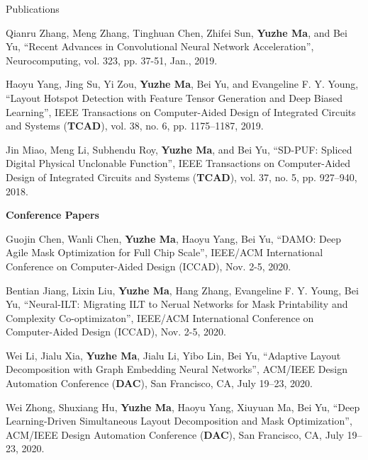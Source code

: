 \begin{rSection}{Publications}
\begin{description}[font=\normalfont]
\item[{[J3]}]{
	Qianru Zhang, Meng Zhang, Tinghuan Chen, Zhifei Sun, \textbf{Yuzhe Ma}, and Bei Yu,
	``Recent Advances in Convolutional Neural Network Acceleration'', 
	Neurocomputing, vol. 323, pp. 37-51, Jan., 2019.
}

\item[{[J2]}]{
	Haoyu Yang, Jing Su, Yi Zou, \textbf{Yuzhe Ma}, Bei Yu, and Evangeline F. Y. Young, 
	``Layout Hotspot Detection with Feature Tensor Generation and Deep Biased Learning'', 
	IEEE Transactions on Computer-Aided Design of Integrated Circuits and Systems (\textbf{TCAD}), vol. 38, no. 6, pp. 1175--1187, 2019.
}

\item[{[J1]}]{
	Jin Miao, Meng Li, Subhendu Roy, \textbf{Yuzhe Ma}, and Bei Yu, 
	``SD-PUF: Spliced Digital Physical Unclonable Function'', 
	IEEE Transactions on Computer-Aided Design of Integrated Circuits and Systems (\textbf{TCAD}), vol. 37, no. 5, pp. 927--940, 2018.
}
\end{description}


\textbf{Conference Papers}
\begin{description}[font=\normalfont]

\item[{[C15]}]{
        Guojin Chen, Wanli Chen, \textbf{Yuzhe Ma}, Haoyu Yang, Bei Yu,
        ``DAMO: Deep Agile Mask Optimization for Full Chip Scale'',
        IEEE/ACM International Conference on Computer-Aided Design (ICCAD), Nov. 2-5, 2020.
    }

\item[{[C14]}]{
        Bentian Jiang, Lixin Liu, \textbf{Yuzhe Ma}, Hang Zhang, Evangeline F. Y. Young, Bei Yu,
        ``Neural-ILT: Migrating ILT to Nerual Networks for Mask Printability and Complexity Co-optimizaton'',
        IEEE/ACM International Conference on Computer-Aided Design (ICCAD), Nov. 2-5, 2020.
    }

\item[{[C13]}]{
        Wei Li, Jialu Xia, \textbf{Yuzhe Ma}, Jialu Li, Yibo Lin, Bei Yu, 
        ``Adaptive Layout Decomposition with Graph Embedding Neural Networks'', 
        ACM/IEEE Design Automation Conference (\textbf{DAC}), San Francisco, CA, July 19–23, 2020.
    }

\item[{[C12]}]{
        Wei Zhong, Shuxiang Hu, \textbf{Yuzhe Ma}, Haoyu Yang, Xiuyuan Ma, Bei Yu, 
        ``Deep Learning-Driven Simultaneous Layout Decomposition and Mask Optimization'', 
        ACM/IEEE Design Automation Conference (\textbf{DAC}), San Francisco, CA, July 19–23, 2020.
    }


\end{description}
\end{rSection}
